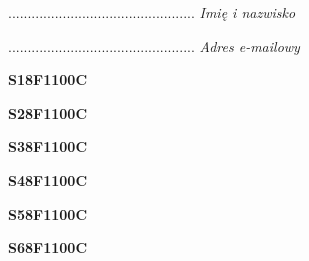 \begin{turn}{90}\begin{minipage}{\linewidth} \vspace{20mm} ................................................  \textit{Imię i nazwisko}\end{minipage}\end{turn}

\begin{turn}{90}\begin{minipage}{\linewidth} \vspace{20mm} ................................................  \textit{Adres e-mailowy}\end{minipage}\end{turn}

\begin{turn}{90}\huge \begin{minipage}{\linewidth} \vspace{10mm}\textbf{S18F1100C}\end{minipage}\end{turn}

\begin{turn}{90}\huge \begin{minipage}{\linewidth} \vspace{10mm}\textbf{S28F1100C}\end{minipage}\end{turn}

\begin{turn}{90}\huge \begin{minipage}{\linewidth} \vspace{10mm}\textbf{S38F1100C}\end{minipage}\end{turn}

\begin{turn}{90}\huge \begin{minipage}{\linewidth} \vspace{10mm}\textbf{S48F1100C}\end{minipage}\end{turn}

\begin{turn}{90}\huge \begin{minipage}{\linewidth} \vspace{10mm}\textbf{S58F1100C}\end{minipage}\end{turn}

\begin{turn}{90}\huge \begin{minipage}{\linewidth} \vspace{10mm}\textbf{S68F1100C}\end{minipage}\end{turn}


